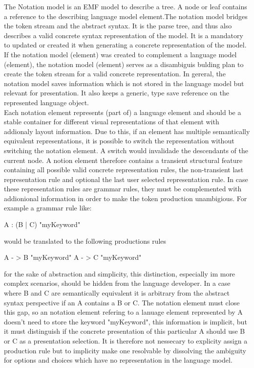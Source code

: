 The Notation model is an EMF model to describe a tree. A node or leaf contains a reference to the describing language model element.The notation model bridges the token stream and the abstract syntax. It is the parse tree, and thus also describes a valid concrete syntax representation of the model.  It is a mandatory to updated or created it when generating a concrete representation of the model. If the notation model (element) was created to complement a language model (element), the notation model (element) serves as a disambiguis bulding plan to create the token stream for a valid concrete representation. In gereral, the notation model saves information which is not stored in the language model but relevant for presentation. It also keeps a generic, type save reference on the represented language object.\\
Each notation element represents (part of) a language element and should be a stable container for different visual representations of that element with addionaly layout information.  Due to this, if an element has multiple semantically equivalent representations, it is possible to switch the representation without switching the notation element. A switch would invalidade the descendants of the current node. A notion element therefore contains a transient structural feature containing all possible valid concrete representation rules, the non-transient last representation rule and optional the last user selected representation rule. In case these representation rules are grammar rules, they must be complemented with addionional information in order to make the token production unambigious. For example a grammar rule like:
\begin{xtxt}
A : (B | C) "myKeyword"
\end{xtxt}
would be translated to the following productions rules 
\begin{xtxt}
A - > B "myKeyword"
A - > C "myKeyword"
\end{xtxt}
for the sake of abstraction and simplicity, this distinction, especially im more complex scenarios, should be hidden from the language developer. In a case where B and C are semantically equivalent  it is arbitrary from the abstract syntax perspective if an A contains a B or C. The notation element must close this gap, so an notation element refering to a lanuage element represented by A doesn't need to store the keyword "myKeyword", this information is implicit, but it must distinguish if the concrete presentation of this particular A should use B or C as a presentation selection. It is therefore not nessecary to explicity assign  a production rule but to implicity make one resolvable by dissolving the ambiguity for options and choices which have no representation in the language model. \\
